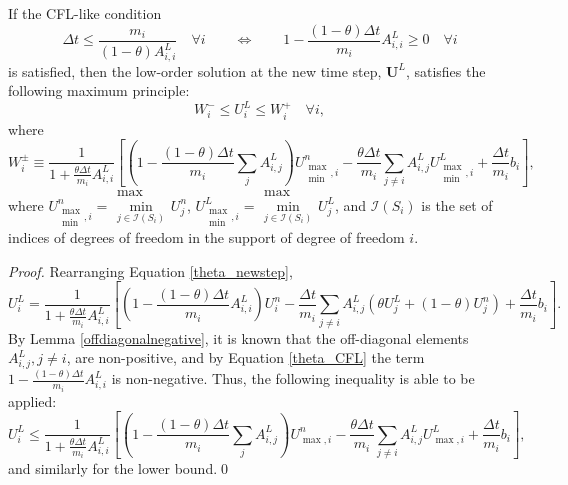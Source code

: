 \begin{theorem}
If the CFL-like condition
\begin{equation}\label{theta_CFL}
   \Delta t \leq \frac{m_i}{(1-\theta)A_{i,i}^L}\quad\forall i
   \qquad\Longleftrightarrow\qquad
   1 - \frac{(1-\theta)\Delta t}{m_i}A_{i,i}^L \geq 0\quad\forall i
\end{equation}
is satisfied, then
the low-order solution at the new time step, $\mathbf{U}^L$, satisfies the following maximum principle:
\begin{equation}\label{theta_max_principle}
   W_i^- \le U_i^L \le W_i^+\quad\forall i,
\end{equation}
where
\begin{equation}\label{theta_W}
   W_i^\pm \equiv \frac{1}{1+\frac{\theta\Delta t}{m_i}A_{i,i}^L}
     \left[\left(1 - \frac{(1-\theta)
     \Delta t}{m_i}\sum\limits_j A_{i,j}^L\right)U_{\substack{\max\\\min},i}^n
    -\frac{\theta\Delta t}{m_i}\sum\limits_{j\ne i}A_{i,j}^L
     U_{\substack{\max\\\min},i}^L
    +\frac{\Delta t}{m_i}b_i\right],
\end{equation}
where $U_{\substack{\max\\\min},i}^n = \substack{\max\\\min\limits_{j\in \mathcal{I}(S_i)}}U_j^n$,
$U_{\substack{\max\\\min},i}^L = \substack{\max\\\min\limits_{j\in \mathcal{I}(S_i)}}U_j^L$,
and $\mathcal{I}(S_i)$ is the set of indices of degrees of freedom in the
support of degree of freedom $i$.
\end{theorem}
\begin{proof}
Rearranging Equation \ref{theta_newstep},
\[
   U_i^L = \frac{1}{1+\frac{\theta\Delta t}{m_i}A_{i,i}^L}
     \left[\left(1 - \frac{(1-\theta)\Delta t}{m_i}A_{i,i}^L\right)U_i^n
    -\frac{\Delta t}{m_i}\sum\limits_{j\ne i}A_{i,j}^L
     \left(\theta U_j^L
    +(1-\theta) U_j^n\right)
    +\frac{\Delta t}{m_i}b_i\right].
\]
By Lemma \ref{offdiagonalnegative}, it is known that the off-diagonal
elements $A^L_{i,j}, j\ne i$, are non-positive, and by Equation \ref{theta_CFL}
the term $1 - \frac{(1-\theta)\Delta t}{m_i}A_{i,i}^L$ is non-negative.
Thus, the following inequality is able to be applied:
\[
   U_i^L \le
     \frac{1}{1+\frac{\theta\Delta t}{m_i}A_{i,i}^L}
     \left[\left(1 - \frac{(1-\theta)
     \Delta t}{m_i}\sum\limits_j A_{i,j}^L\right)U_{\max,i}^n
    -\frac{\theta\Delta t}{m_i}\sum\limits_{j\ne i}A_{i,j}^L
     U_{\max,i}^L
    +\frac{\Delta t}{m_i}b_i\right],
\]
and similarly for the lower bound.\qed
\end{proof}